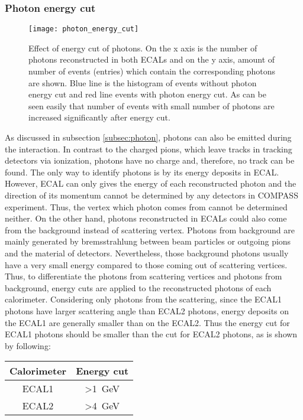 \subsubsection{Photon energy cut}
\begin{figure}[!t]
	\centering
	\texttt{[image: photon\_energy\_cut]}
	\caption{Effect of energy cut of photons. On the x axis is the number of photons reconstructed in both ECALs and on the y axis, amount of number of events (entries) which contain the corresponding photons are shown. Blue line is the histogram of events without photon energy cut and red line events with photon energy cut. As can be seen easily that number of events with small number of photons are increased significantly after energy cut.}
	\label{fig:photon_energy_cut}
\end{figure}
As discussed in subsection \ref{subsec:photon}, photons can also be emitted during the interaction. In contrast to the charged pions, which leave tracks in tracking detectors via ionization, photons have no charge and, therefore, no track can be found. The only way to identify photons is by its energy deposits in ECAL. However, ECAL can only gives the energy of each reconstructed photon and the direction of its momentum cannot be determined by any detectors in COMPASS experiment. Thus, the vertex which photon comes from cannot be determined neither. On the other hand, photons reconstructed in ECALs could also come from the background instead of scattering vertex. Photons from background are mainly generated by bremsstrahlung between beam particles or outgoing pions and the material of detectors. Nevertheless, those background photons usually have a very small energy compared to those coming out of scattering vertices. Thus, to differentiate the photons from scattering vertices and photons from background, energy cuts are applied to the reconstructed photons of each calorimeter. Considering only photons from the scattering, since the ECAL1 photons have larger scattering angle than ECAL2 photons, energy deposits on the ECAL1 are generally smaller than on the ECAL2. Thus the energy cut for ECAL1 photons should be smaller than the cut for ECAL2 photons, as is shown by following:

\begin{center}
	\begin{tabular}{c||c}
		Calorimeter & Energy cut      \\
		\hline
		ECAL1       & \textgreater{}\SI{1}{\giga\electronvolt} \\
		\hline
		ECAL2       & \textgreater{}\SI{4}{\giga\electronvolt}
	\end{tabular}
\end{center}



